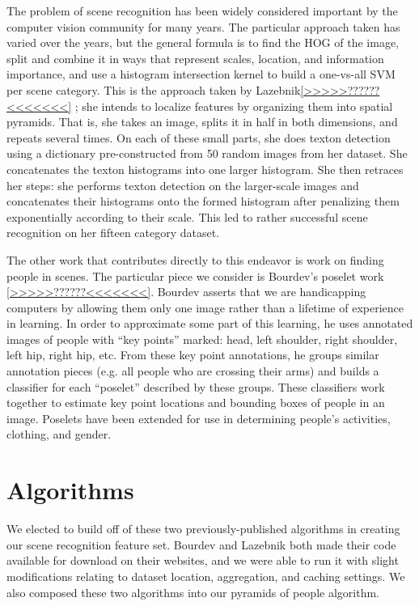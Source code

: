 \documentclass[11pt]{article}
\begin{document}
The problem of scene recognition has been widely considered important by the computer vision community for many years.  The particular approach taken has varied over the years, but the general formula is to find the HOG of the image, split and combine it in ways that represent scales, location, and information importance, and use a histogram intersection kernel to build a one-vs-all SVM per scene category.  This is the approach taken by Lazebnik\ref{>>>>>??????<<<<<<<} ; she intends to localize features by organizing them into spatial pyramids.  That is, she takes an image, splits it in half in both dimensions, and repeats several times.  On each of these small parts, she does texton detection using a dictionary pre-constructed from 50 random images from her dataset.  She concatenates the texton histograms into one larger histogram.  She then retraces her steps: she performs texton detection on the larger-scale images and concatenates their histograms onto the formed histogram after penalizing them exponentially according to their scale.  This led to rather successful scene recognition on her fifteen category dataset.

The other work that contributes directly to this endeavor is work on finding people in scenes.  The particular piece we consider is Bourdev's poselet work \ref{>>>>>??????<<<<<<<}.  Bourdev asserts that we are handicapping computers by allowing them only one image rather than a lifetime of experience in learning.  In order to approximate some part of this learning, he uses annotated images of people with ``key points'' marked: head, left shoulder, right shoulder, left hip, right hip, etc.  From these key point annotations, he groups similar annotation pieces (e.g. all people who are crossing their arms) and builds a classifier for each ``poselet'' described by these groups.  These classifiers work together to estimate key point locations and bounding boxes of people in an image.  Poselets have been extended for use in determining people's activities, clothing, and gender.

\section{Algorithms}

We elected to build off of these two previously-published algorithms in creating our scene recognition feature set.  Bourdev and Lazebnik both made their code available for download on their websites, and we were able to run it with slight modifications relating to dataset location, aggregation, and caching settings.  We also composed these two algorithms into our pyramids of people algorithm.
\end{document}
